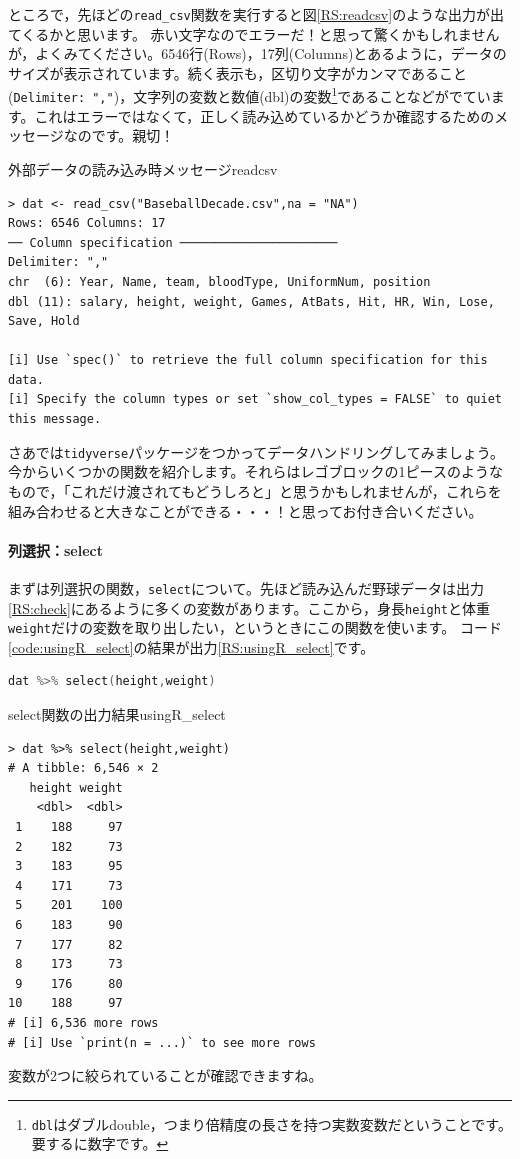 \documentclass{ltjsbook}
\begin{document}
ところで，先ほどの\verb|read_csv|関数を実行すると図\ref{RS:readcsv}のような出力が出てくるかと思います。
赤い文字なのでエラーだ！と思って驚くかもしれませんが，よくみてください。6546行(Rows)，17列(Columns)とあるように，データのサイズが表示されています。続く表示も，区切り文字がカンマであること(\verb|Delimiter: ","|)，文字列の変数と数値(dbl)の変数\footnote{\verb|dbl|はダブルdouble，つまり倍精度の長さを持つ実数変数だということです。要するに数字です。}であることなどがでています。これはエラーではなくて，正しく読み込めているかどうか確認するためのメッセージなのです。親切！

\begin{Rscreen}{外部データの読み込み時メッセージ}{readcsv}
\begin{verbatim}
> dat <- read_csv("BaseballDecade.csv",na = "NA")
Rows: 6546 Columns: 17                                                                             
── Column specification ──────────────────────
Delimiter: ","
chr  (6): Year, Name, team, bloodType, UniformNum, position
dbl (11): salary, height, weight, Games, AtBats, Hit, HR, Win, Lose, Save, Hold

[i] Use `spec()` to retrieve the full column specification for this data.
[i] Specify the column types or set `show_col_types = FALSE` to quiet this message.
\end{verbatim}
\end{Rscreen}

さあでは\verb|tidyverse|パッケージをつかってデータハンドリングしてみましょう。
今からいくつかの関数を紹介します。それらはレゴブロックの1ピースのようなもので，「これだけ渡されてもどうしろと」と思うかもしれませんが，これらを組み合わせると大きなことができる・・・！と思ってお付き合いください。
\paragraph{列選択：select}
まずは列選択の関数，\verb|select|について。先ほど読み込んだ野球データは出力\ref{RS:check}にあるように多くの変数があります。ここから，身長\verb|height|と体重\verb|weight|だけの変数を取り出したい，というときにこの関数を使います。
コード\ref{code:usingR_select}の結果が出力\ref{RS:usingR_select}です。
\begin{lstlisting}[language=c++,label={code:usingR_select},caption={select関数}]
dat %>% select(height,weight)
\end{lstlisting}
\begin{Rscreen}{select関数の出力結果}{usingR_select}
	\begin{verbatim}
> dat %>% select(height,weight)
# A tibble: 6,546 × 2
   height weight
    <dbl>  <dbl>
 1    188     97
 2    182     73
 3    183     95
 4    171     73
 5    201    100
 6    183     90
 7    177     82
 8    173     73
 9    176     80
10    188     97
# [i] 6,536 more rows
# [i] Use `print(n = ...)` to see more rows
\end{verbatim}
\end{Rscreen}
変数が2つに絞られていることが確認できますね。
\end{document}
